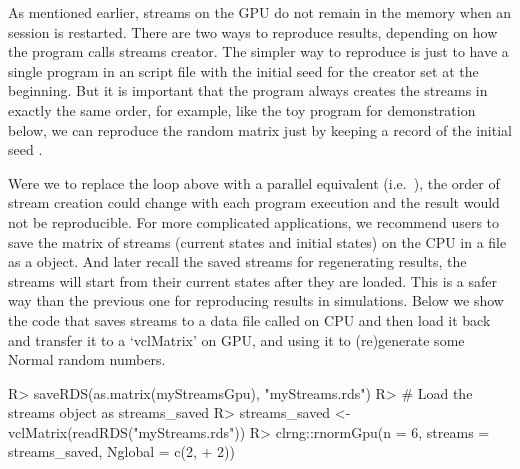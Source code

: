 \documentclass[article,nojss]{jss}\usepackage[]{graphicx}\usepackage[]{color}
\begin{document}
As mentioned earlier, streams on the GPU do not remain in the memory when an  session is restarted. There are two ways to reproduce results, depending on how the program calls streams creator.
The simpler way to reproduce is just to have a single program in an  script file with the initial seed for the creator set at the beginning.  But it is important that the program always creates the streams in exactly the same order, for example, like the toy  program for demonstration below, we can reproduce the random matrix  just by keeping a record of the initial seed .
\begin{CodeChunk}
\end{CodeChunk} 


Were we to replace the  loop above with a parallel equivalent (i.e.\ ), the order of stream creation could change with each program execution and the result would not be reproducible.  For more complicated applications, we recommend users to save the matrix of streams (current states and initial states) on the CPU in a file as a  object. And later recall the saved streams for regenerating results, the streams will start from their current states after they are loaded. This is a safer way than the previous one for reproducing results in simulations. Below we show the code that saves streams to a data file called  on CPU and then load it back and transfer it to a `vclMatrix'  on GPU, and using it to (re)generate some Normal random numbers.
\begin{CodeChunk}
\begin{CodeInput}
R> saveRDS(as.matrix(myStreamsGpu), "myStreams.rds")
R> # Load the streams object as streams_saved
R> streams_saved <- vclMatrix(readRDS("myStreams.rds"))
R> clrng::rnormGpu(n = 6, streams = streams_saved, Nglobal = c(2,
+    2))
\end{CodeInput} 
\end{CodeChunk} 
\end{document}
